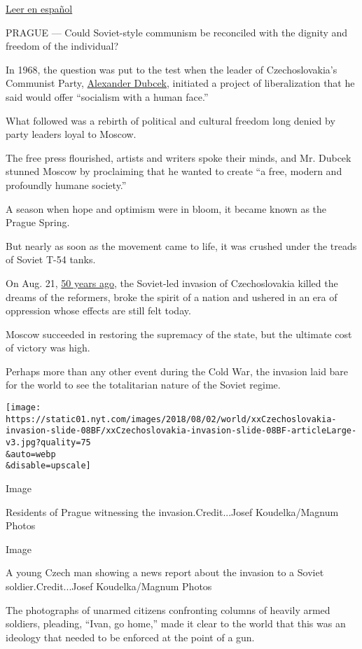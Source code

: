 \href{https://www.nytimes.com/es/2018/08/23/primavera-praga-aniversario-50-urss/}{Leer
en español}

PRAGUE --- Could Soviet-style communism be reconciled with the dignity
and freedom of the individual?

In 1968, the question was put to the test when the leader of
Czechoslovakia's Communist Party,
\href{https://www.nytimes.com/1992/11/09/obituaries/alexander-dubcek-70-dies-in-prague.html}{Alexander
Dubcek}, initiated a project of liberalization that he said would offer
``socialism with a human face.''

What followed was a rebirth of political and cultural freedom long
denied by party leaders loyal to Moscow.

The free press flourished, artists and writers spoke their minds, and
Mr. Dubcek stunned Moscow by proclaiming that he wanted to create ``a
free, modern and profoundly humane society.''

A season when hope and optimism were in bloom, it became known as the
Prague Spring.

But nearly as soon as the movement came to life, it was crushed under
the treads of Soviet T-54 tanks.

On Aug. 21,
\href{https://archive.nytimes.com/www.nytimes.com/learning/general/onthisday/big/0820.html\#article}{50
years ago}, the Soviet-led invasion of Czechoslovakia killed the dreams
of the reformers, broke the spirit of a nation and ushered in an era of
oppression whose effects are still felt today.

Moscow succeeded in restoring the supremacy of the state, but the
ultimate cost of victory was high.

Perhaps more than any other event during the Cold War, the invasion laid
bare for the world to see the totalitarian nature of the Soviet regime.

\texttt{[image: https://static01.nyt.com/images/2018/08/02/world/xxCzechoslovakia-invasion-slide-08BF/xxCzechoslovakia-invasion-slide-08BF-articleLarge-v3.jpg?quality=75\\\&auto=webp\\\&disable=upscale]}

Image

Residents of Prague witnessing the invasion.Credit...Josef
Koudelka/Magnum Photos

Image

A young Czech man showing a news report about the invasion to a Soviet
soldier.Credit...Josef Koudelka/Magnum Photos

The photographs of unarmed citizens confronting columns of heavily armed
soldiers, pleading, ``Ivan, go home,'' made it clear to the world that
this was an ideology that needed to be enforced at the point of a gun.

